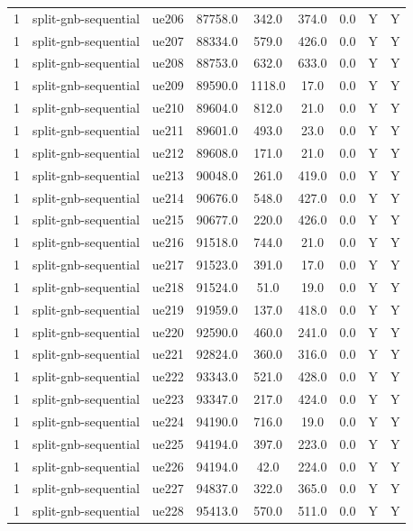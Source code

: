 \begin{table}[ht]
\begin{tabular}{|c|c|c|c|c|c|c|c|c|}
1 & split-gnb-sequential & ue206 & 87758.0 & 342.0 & 374.0 & 0.0 & Y & Y \\
1 & split-gnb-sequential & ue207 & 88334.0 & 579.0 & 426.0 & 0.0 & Y & Y \\
1 & split-gnb-sequential & ue208 & 88753.0 & 632.0 & 633.0 & 0.0 & Y & Y \\
1 & split-gnb-sequential & ue209 & 89590.0 & 1118.0 & 17.0 & 0.0 & Y & Y \\
1 & split-gnb-sequential & ue210 & 89604.0 & 812.0 & 21.0 & 0.0 & Y & Y \\
1 & split-gnb-sequential & ue211 & 89601.0 & 493.0 & 23.0 & 0.0 & Y & Y \\
1 & split-gnb-sequential & ue212 & 89608.0 & 171.0 & 21.0 & 0.0 & Y & Y \\
1 & split-gnb-sequential & ue213 & 90048.0 & 261.0 & 419.0 & 0.0 & Y & Y \\
1 & split-gnb-sequential & ue214 & 90676.0 & 548.0 & 427.0 & 0.0 & Y & Y \\
1 & split-gnb-sequential & ue215 & 90677.0 & 220.0 & 426.0 & 0.0 & Y & Y \\
1 & split-gnb-sequential & ue216 & 91518.0 & 744.0 & 21.0 & 0.0 & Y & Y \\
1 & split-gnb-sequential & ue217 & 91523.0 & 391.0 & 17.0 & 0.0 & Y & Y \\
1 & split-gnb-sequential & ue218 & 91524.0 & 51.0 & 19.0 & 0.0 & Y & Y \\
1 & split-gnb-sequential & ue219 & 91959.0 & 137.0 & 418.0 & 0.0 & Y & Y \\
1 & split-gnb-sequential & ue220 & 92590.0 & 460.0 & 241.0 & 0.0 & Y & Y \\
1 & split-gnb-sequential & ue221 & 92824.0 & 360.0 & 316.0 & 0.0 & Y & Y \\
1 & split-gnb-sequential & ue222 & 93343.0 & 521.0 & 428.0 & 0.0 & Y & Y \\
1 & split-gnb-sequential & ue223 & 93347.0 & 217.0 & 424.0 & 0.0 & Y & Y \\
1 & split-gnb-sequential & ue224 & 94190.0 & 716.0 & 19.0 & 0.0 & Y & Y \\
1 & split-gnb-sequential & ue225 & 94194.0 & 397.0 & 223.0 & 0.0 & Y & Y \\
1 & split-gnb-sequential & ue226 & 94194.0 & 42.0 & 224.0 & 0.0 & Y & Y \\
1 & split-gnb-sequential & ue227 & 94837.0 & 322.0 & 365.0 & 0.0 & Y & Y \\
1 & split-gnb-sequential & ue228 & 95413.0 & 570.0 & 511.0 & 0.0 & Y & Y \\

\end{tabular}
\end{table}
